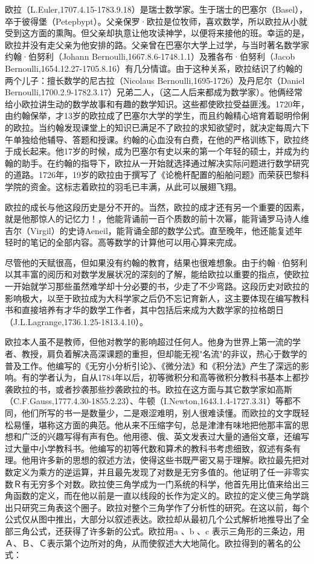 \documentclass[UTF8]{ctexbook}
\begin{document}
欧拉（L.Euler,1707.4.15-1783.9.18）是瑞士数学家。生于瑞士的巴塞尔（Basel），卒于彼得堡（Petepbypt）。父亲保罗·欧拉是位牧师，喜欢数学，所以欧拉从小就受到这方面的熏陶。但父亲却执意让他攻读神学，以便将来接他的班。幸运的是，欧拉并没有走父亲为他安排的路。父亲曾在巴塞尔大学上过学，与当时著名数学家约翰·伯努利（Johann Bernoulli,1667.8.6-1748.1.1）及雅各布·伯努利（Jacob Bernoulli,1654.12.27-1705.8.16）有几分情谊。由于这种关系，欧拉结识了约翰的两个儿子：擅长数学的尼古拉（Nicolaus Bernoulli,1695-1726）及丹尼尔（Daniel Bernoulli,1700.2.9-1782.3.17）兄弟二人，（这二人后来都成为数学家）。他俩经常给小欧拉讲生动的数学故事和有趣的数学知识。这些都使欧拉受益匪浅。1720年，由约翰保举，才13岁的欧拉成了巴塞尔大学的学生，而且约翰精心培育着聪明伶俐的欧拉。当约翰发现课堂上的知识已满足不了欧拉的求知欲望时，就决定每周六下午单独给他辅导、答题和授课。约翰的心血没有白费，在他的严格训练下，欧拉终于成长起来。他17岁的时候，成为巴塞尔有史以来的第一个年轻的硕士，并成为约翰的助手。在约翰的指导下，欧拉从一开始就选择通过解决实际问题进行数学研究的道路。1726年，19岁的欧拉由于撰写了《论桅杆配置的船舶问题》而荣获巴黎科学院的资金。这标志着欧拉的羽毛已丰满，从此可以展翅飞翔。

欧拉的成长与他这段历史是分不开的。当然，欧拉的成才还有另一个重要的因素，就是他那惊人的记忆力！，他能背诵前一百个质数的前十次幂，能背诵罗马诗人维吉尔（Virgil）的史诗Aeneil，能背诵全部的数学公式。直至晚年，他还能复述年轻时的笔记的全部内容。高等数学的计算他可以用心算来完成。

尽管他的天赋很高，但如果没有约翰的教育，结果也很难想象。由于约翰·伯努利以其丰富的阅历和对数学发展状况的深刻的了解，能给欧拉以重要的指点，使欧拉一开始就学习那些虽然难学却十分必要的书，少走了不少弯路。这段历史对欧拉的影响极大，以至于欧拉成为大科学家之后仍不忘记育新人，这主要体现在编写教科书和直接培养有才华的数学工作者，其中包括后来成为大数学家的拉格朗日（J.L.Lagrange,1736.1.25-1813.4.10）。

欧拉本人虽不是教师，但他对教学的影响超过任何人。他身为世界上第一流的学者、教授，肩负着解决高深课题的重担，但却能无视"名流"的非议，热心于数学的普及工作。他编写的《无穷小分析引论》、《微分法》和《积分法》产生了深远的影响。有的学者认为，自从1784年以后，初等微积分和高等微积分教科书基本上都抄袭欧拉的书，或者抄袭那些抄袭欧拉的书。欧拉在这方面与其它数学家如高斯（C.F.Gauss,1777.4.30-1855.2.23）、牛顿（I.Newton,1643.1.4-1727.3.31）等都不同，他们所写的书一是数量少，二是艰涩难明，别人很难读懂。而欧拉的文字既轻松易懂，堪称这方面的典范。他从来不压缩字句，总是津津有味地把他那丰富的思想和广泛的兴趣写得有声有色。他用德、俄、英文发表过大量的通俗文章，还编写过大量中小学教科书。他编写的初等代数和算术的教科书考虑细致，叙述有条有理。他用许多新的思想的叙述方法，使得这些书既严密又易于理解。欧拉最先把对数定义为乘方的逆运算，并且最先发现了对数是无穷多值的。他证明了任一非零实数Ｒ有无穷多个对数。欧拉使三角学成为一门系统的科学，他首先用比值来给出三角函数的定义，而在他以前是一直以线段的长作为定义的。欧拉的定义使三角学跳出只研究三角表这个圈子。欧拉对整个三角学作了分析性的研究。在这以前，每个公式仅从图中推出，大部分以叙述表达。欧拉却从最初几个公式解析地推导出了全部三角公式，还获得了许多新的公式。欧拉用a 、b 、c 表示三角形的三条边，用Ａ、Ｂ、Ｃ表示第个边所对的角，从而使叙述大大地简化。欧拉得到的著名的公式：
\end{document}

